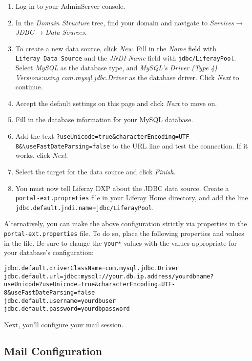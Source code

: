 \begin{enumerate}
\def\labelenumi{\arabic{enumi}.}
\item
  Log in to your AdminServer console.
\item
  In the \emph{Domain Structure} tree, find your domain and navigate to
  \emph{Services} → \emph{JDBC} → \emph{Data Sources}.
\item
  To create a new data source, click \emph{New}. Fill in the \emph{Name}
  field with \texttt{Liferay\ Data\ Source} and the \emph{JNDI Name}
  field with \texttt{jdbc/LiferayPool}. Select \emph{MySQL} as the
  database type, and \emph{MySQL's Driver (Type 4) Versions:using
  com.mysql.jdbc.Driver} as the database driver. Click \emph{Next} to
  continue.
\item
  Accept the default settings on this page and click \emph{Next} to move
  on.
\item
  Fill in the database information for your MySQL database.
\item
  Add the text
  \texttt{?useUnicode=true\&characterEncoding=UTF-8\&\textbackslash{}useFastDateParsing=false}
  to the URL line and test the connection. If it works, click
  \emph{Next}.
\item
  Select the target for the data source and click \emph{Finish}.
\item
  You must now tell Liferay DXP about the JDBC data source. Create a
  \texttt{portal-ext.propreties} file in your Liferay Home directory,
  and add the line \texttt{jdbc.default.jndi.name=jdbc/LiferayPool}.
\end{enumerate}

Alternatively, you can make the above configuration strictly via
properties in the \texttt{portal-ext.properties} file. To do so, place
the following properties and values in the file. Be sure to change the
\texttt{your*} values with the values appropriate for your database's
configuration:

\begin{verbatim}
jdbc.default.driverClassName=com.mysql.jdbc.Driver
jdbc.default.url=jdbc:mysql://your.db.ip.address/yourdbname?useUnicode?useUnicode=true&characterEncoding=UTF-8&useFastDateParsing=false
jdbc.default.username=yourdbuser
jdbc.default.password=yourdbpassword
\end{verbatim}

Next, you'll configure your mail session.

\subsection{Mail Configuration}\label{mail-configuration-3}

